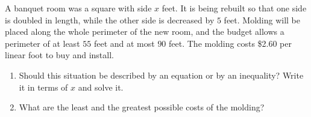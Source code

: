 A banquet room was a square with side $x$ feet. It is being rebuilt so that one side is doubled in length, while the other side is decreased by $5$ feet. Molding will be placed along the whole perimeter of the new room, and the budget allows a perimeter of at least $55$ feet and at most $90$ feet. The molding costs \$2.60 per linear foot to buy and install.
\begin{enumerate}
\item[(a)] Should this situation be described by an equation or by an inequality? Write it in terms of $x$ and solve it.
\item[(b)] What are the least and the greatest possible costs of the molding?
\end{enumerate}
